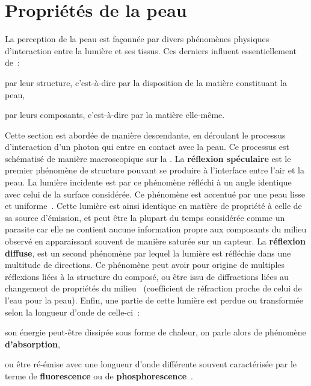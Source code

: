 \section{Propriétés de la peau}
La perception de la peau est façonnée par divers phénomènes physiques d'interaction entre la lumière et ses tissus. Ces derniers influent essentiellement de~:~
\begin{inlinerate}
    \item par leur structure, c’est-à-dire par la disposition de la matière constituant la peau,
    \item par leurs composants, c’est-à-dire par la matière elle-même.
\end{inlinerate}
Cette section est abordée de manière descendante, en déroulant le processus d'interaction d'un photon qui entre en contact avec la peau. Ce processus est schématisé de manière macroscopique sur la . La \textbf{réflexion spéculaire} est le premier phénomène de structure pouvant se produire à l'interface entre l'air et la peau. La lumière incidente est par ce phénomène réfléchi à un angle identique avec celui de la surface considérée. Ce phénomène est accentué par une peau lisse et uniforme~\cite{Yang2009}. Cette lumière est ainsi identique en matière de propriété à celle de sa source d'émission, et peut être la plupart du temps considérée comme un parasite car elle ne contient aucune information propre aux composants du milieu observé en apparaissant souvent de manière saturée sur un capteur. La \textbf{réflexion diffuse}, est un second phénomène par lequel la lumière est réfléchie dans une multitude de directions. Ce phénomène peut avoir pour origine de multiples réflexions liées à la structure du composé, ou être issu de diffractions liées au changement de propriétés du milieu~\cite{Yang2009} (coefficient de réfraction proche de celui de l'eau pour la peau). Enfin, une partie de cette lumière est perdue ou transformée selon la longueur d'onde de celle-ci~:
\begin{inlinerate}
    \item son énergie peut-être dissipée sous forme de chaleur, on parle alors de phénomène \textbf{d'absorption},
    \item ou être ré-émise avec une longueur d'onde différente souvent caractérisée par le terme de \textbf{fluorescence} ou de \textbf{phosphorescence}~\cite{Kollias2002}.
\end{inlinerate}\par

